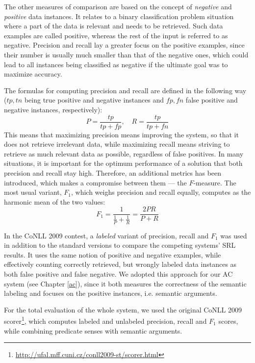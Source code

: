 \documentclass[12pt,notitlepage]{report}
\begin{document}
The other measures of comparison are based on the concept of \emph{negative} and \emph{positive} data instances. It relates to a binary classification problem situation where a part of the data is relevant and needs to be retrieved. Such data examples are called positive, whereas the rest of the input is referred to as negative. Precision and recall lay a greater focus on the positive examples, since their number is usually much smaller than that of the negative ones, which could lead to all instances being classified as negative if the ultimate goal was to maximize accuracy.

The formulas for computing precision and recall are defined in the following way ($tp,tn$ being true positive and negative instances and $fp,fn$ false positive and negative instances, respectively):
\begin{equation}
P = \frac{tp}{tp + fp},\quad R = \frac{tp}{tp + fn}
\end{equation}
This means that maximizing precision means improving the system, so that it does not retrieve irrelevant data, while maximizing recall means striving to retrieve as much relevant data as possible, regardless of false positives. In many situations, it is important for the optimum performance of a solution that both precision and recall stay high. Therefore, an additional metrics has been introduced, which makes a compromise between them --- the $F$-measure. The most usual variant, $F_1$, which weighs precision and recall equally, computes as the harmonic mean of the two values:
\begin{equation}
F_1 = \frac{1}{\frac{1}{P} + \frac{1}{R}} = \frac{2PR}{P+R}
\end{equation}

In the CoNLL 2009 contest, a \emph{labeled} variant of precision, recall and $F_1$ \citep{hajic09} was used in addition to the standard versions to compare the competing systems' SRL results. It uses the same notion of positive and negative examples, while effectively counting correctly retrieved, but wrongly labeled data instances as both false positive and false negative. We adopted this approach for our AC system (see Chapter \ref{ac}), since it both measures the correctness of the semantic labeling and focuses on the positive instances, i.e. semantic arguments.

For the total evaluation of the whole system, we used the original CoNLL 2009 scorer\footnote{\url{http://ufal.mff.cuni.cz/conll2009-st/scorer.html}}, which computes labeled and unlabeled precision, recall and $F_1$ scores, while combining predicate senses with semantic arguments.
\end{document}
